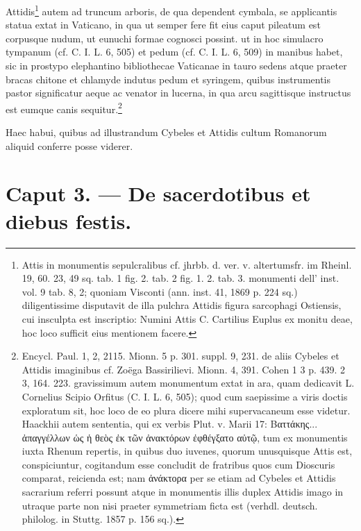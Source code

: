 \documentclass[a4paper, 11pt, oneside, polutonikogreek, german, twocolumn]{article}
\begin{document}
Attidis\footnote{Attis in monumentis sepulcralibus cf. jhrbb. d. ver. v. altertumsfr. im Rheinl. 19, 60. 23, 49 sq. tab. 1 fig. 2. tab. 2 fig. 1. 2. tab. 3. monumenti dell' inst. vol. 9 tab. 8, 2; quoniam Visconti (ann. inst. 41, 1869 p. 224 sq.) diligentissime disputavit de illa pulchra Attidis figura sarcophagi Ostiensis, cui insculpta est inscriptio: Numini Attis C. Cartilius Euplus ex monitu deae, hoc loco sufficit eius mentionem facere.} autem ad truncum arboris, de qua dependent cymbala, se applicantis statua extat in Vaticano, in qua ut semper fere fit eius caput pileatum est corpusque nudum, ut eunuchi formae cognosci possint. ut in hoc simulacro tympanum (cf. C. I. L. 6, 505) et pedum (cf. C. I. L. 6, 509) in manibus habet, sic in prostypo elephantino bibliothecae Vaticanae in tauro sedens atque praeter bracas chitone et chlamyde indutus pedum et syringem, quibus instrumentis pastor significatur aeque ac venator in lucerna, in qua arcu sagittisque instructus est eumque canis sequitur.\footnote{Encycl. Paul. 1, 2, 2115. Mionn. 5 p. 301. suppl. 9, 231. de aliis Cybeles et Attidis imaginibus cf. Zoëga Bassirilievi. Mionn. 4, 391. Cohen 1 3 p. 439. 2 3, 164. 223. gravissimum autem monumentum extat in ara, quam dedicavit L. Cornelius Scipio Orfitus (C. I. L. 6, 505); quod cum saepissime a viris doctis exploratum sit, hoc loco de eo plura dicere mihi supervacaneum esse videtur. Haackhii autem sententia, qui ex verbis Plut. v. Marii 17: Βαττάκης... ἀπαγγέλλων ὡς ἡ θεὸς ἐκ τῶν ἀνακτόρων ἐφθέγξατο αὐτῷ, tum ex monumentis iuxta Rhenum repertis, in quibus duo iuvenes, quorum unusquisque Attis est, conspiciuntur, cogitandum esse concludit de fratribus quos cum Dioscuris comparat, reicienda est; nam ἀνάκτορα per se etiam ad Cybeles et Attidis sacrarium referri possunt atque in monumentis illis duplex Attidis imago in utraque parte non nisi praeter symmetriam ficta est (verhdl. deutsch. philolog. in Stuttg. 1857 p. 156 sq.).}

Haec habui, quibus ad illustrandum Cybeles et Attidis cultum Romanorum aliquid conferre posse viderer.
\clearpage
\section{Caput 3. --- De sacerdotibus et diebus festis.}
\end{document}
